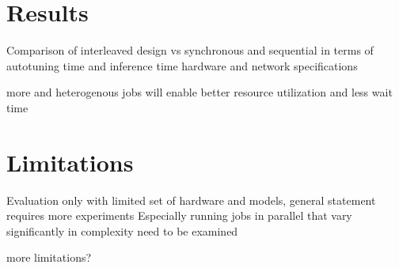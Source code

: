 

\section{Results}
Comparison of interleaved design vs synchronous and sequential in terms of autotuning time and inference time
hardware and network specifications

more and heterogenous jobs will enable better resource utilization and less wait time

\section{Limitations}
Evaluation only with limited set of hardware and models, general statement requires more experiments
Especially running jobs in parallel that vary significantly in complexity need to be examined

more limitations?